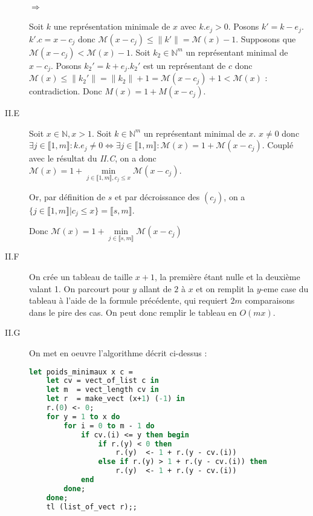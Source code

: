\documentclass{article}
\newcommand{\N}{\mathbb{N}}
\newcommand{\M}{\mathscr{M}}
\newcommand{\norm}[1]{\|#1\|}
\newcommand{\scal}{.}
\newcommand{\seg}[2]{\llbracket #1, #2 \rrbracket}
\begin{document}
\begin{description}
        \paragraph{$\Rightarrow$} Soit $k$ une représentation minimale de $x$ avec $k\scal e_j > 0$. Posons $k' = k-e_j$. $k'\scal c = x-c_j$ donc $\M(x-c_j) \leq \norm{k'} = \M(x) - 1$. Supposons que $\M(x-c_j) < \M(x) - 1$. Soit $k_2\in\N^m$ un représentant minimal de $x-c_j$. Posons $k_2' = k + e_j$.$k_2'$ est un représentant de $c$ donc $\M(x) \leq \norm{k_2'} = \norm{k_2} + 1 = \M(x-c_j) + 1 < \M(x)$ : contradiction. Donc $M(x) = 1 + M(x-c_j)$.

    \item[II.E] Soit $x\in\N, x > 1$. Soit $k\in\N^m$ un représentant minimal de $x$. $x\neq 0$ donc $\exists j\in\seg{1}{m} : k\scal e_j \neq 0 \Leftrightarrow \exists j\in\seg{1}{m} : \M(x) = 1 + \M(x-c_j)$. Couplé avec le résultat du \emph{II.C}, on a donc $\M(x) = 1 + \underset{j\in\seg{1}{m}, c_j\leq x}{\min} \M(x-c_j)$.

        Or, par définition de $s$ et par décroissance des $(c_j)$, on a $\{j\in\seg{1}{m} | c_j \leq x\} = \seg{s}{m}$.

        Donc $\M(x) = 1 + \underset{j\in\seg{s}{m}}{\min} \M(x-c_j)$

    \item[II.F] On crée un tableau de taille $x+1$, la première étant nulle et la deuxième valant 1. On parcourt pour $y$ allant de $2$ à $x$ et on remplit la $y$-eme case du tableau à l'aide de la formule précédente, qui requiert $2m$ comparaisons dans le pire des cas. On peut donc remplir le tableau en $O(mx)$.

    \item[II.G] On met en oeuvre l'algorithme décrit ci-dessus :
        \begin{lstlisting}[language=Caml]
let poids_minimaux x c =
    let cv = vect_of_list c in
    let m  = vect_length cv in
    let r  = make_vect (x+1) (-1) in
    r.(0) <- 0;
    for y = 1 to x do
        for i = 0 to m - 1 do
            if cv.(i) <= y then begin
                if r.(y) < 0 then
                    r.(y)  <- 1 + r.(y - cv.(i))
                else if r.(y) > 1 + r.(y - cv.(i)) then
                    r.(y)  <- 1 + r.(y - cv.(i))
            end
        done;
    done;
    tl (list_of_vect r);;
        \end{lstlisting}
\end{description}
\end{document}
